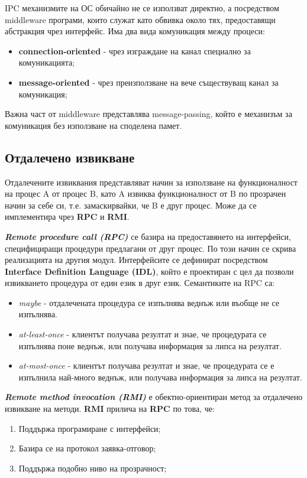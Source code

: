 \documentclass[fleqn,12pt]{article}
\begin{document}
IPC механизмите на ОС обичайно не се използват директно, а посредством middleware програми, които служат като обвивка около тях, предоставящи абстракция чрез интерфейс.
Има два вида комуникация между процеси:
\begin{itemize}
    \item \textbf{connection-oriented} - чрез изграждане на канал специално за комуникацията;
    \item \textbf{message-oriented} - чрез преизползване на вече съществуващ канал за комуникация; 
\end{itemize}

Важна част от middleware представлява message-passing, който е механизъм за комуникация без използване на споделена памет.

\subsection{Отдалечено извикване}

Отдалечените извиквания представляват начин за използване на функционалност на процес A от процес B, като A извиква функционалност от B по прозрачен начин за себе си, т.е. замаскирвайки, че B е друг процес.
Може да се имплементира чрез \textbf{RPC} и \textbf{RMI}.
\bigbreak

\textbf{\textit{Remote procedure call (RPC)}} се базира на предоставянето на интерфейси, специфициращи процедури предлагани от друг процес.
По този начин се скрива реализацията на другия модул.
Интерфейсите се дефинират посредством \textbf{Interface Definition Language (IDL)}, който е проектиран с цел да позволи извикването процедура от един език в друг език.
\bigbreak
Семантиките на RPC са:
\begin{itemize}
    \item \textit{maybe} - отдалечената процедура се изпълнява веднъж или въобще не се изпълнява.
    \item \textit{at-least-once} - клиентът получава резултат и знае, че процедурата се изпълнява поне веднъж, или получава информация за липса на резултат.
    \item \textit{at-most-once} - клиентът получава резултат и знае, че процедурата се е изпълнила най-много веднъж, или получава информация за липса на резултат.
\end{itemize}

\textbf{\textit{Remote method invocation (RMI)}} е обектно-ориентиран метод за отдалечено извикване на методи.
\bigbreak
\textbf{RMI} прилича на \textbf{RPC} по това, че:
\begin{enumerate}
    \item Поддържа програмиране с интерфейси;
    \item Базира се на протокол заявка-отговор;
    \item Поддържа подобно ниво на прозрачност;
\end{enumerate}
\end{document}
